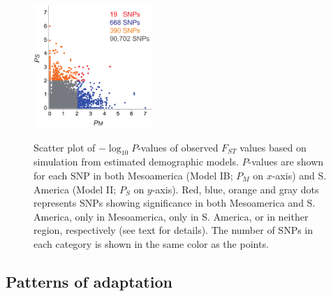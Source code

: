 \begin{figure}[tb]   
  \begin{center}
   \vspace{-0mm}
   \includegraphics[width=0.4\textwidth]{fig/Fig6}
   \renewcommand{\baselinestretch}{0.9}
   \vspace{-3mm}
   \caption{Scatter plot of $-\log_{10} P$-values of observed $F_{ST}$ values based on simulation from estimated demographic models. $P$-values are shown for each SNP in both Mesoamerica (Model IB; $P_M$ on $x$-axis) and S. America (Model II; $P_S$ on $y$-axis).  
   Red, blue, orange and gray dots represents SNPs showing significance in both Mesoamerica and S. America, only in Mesoamerica, only in S. America, or in neither region, respectively (see text for details).
   The number of SNPs in each category is shown in the same color as the points.} 
\vspace{-6mm}
    \label{PvDist}
  \end{center}
\end{figure}

\subsection*{Patterns of adaptation}

